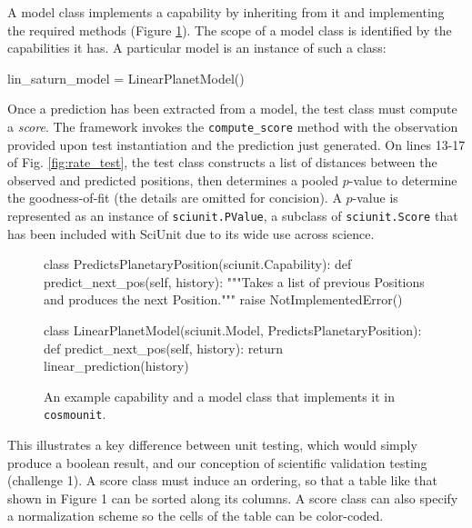 \documentclass[9pt]{sig-alternate}
\newcommand{\verbx}[1]{\lstinline{#1}}
\begin{document}
A model class implements a capability by inheriting from it and implementing the required methods (Figure \ref{fig:capability}).  The scope of a model class is identified by the capabilities it has. A particular model is an instance of such a class: 
\vspace{-3px}
\begin{python}
lin_saturn_model = LinearPlanetModel()
\end{python}
\vspace{-5px}

Once a prediction has been extracted from a model, the test class must compute a \emph{score}. The framework invokes the \verbx{compute_score} method with the observation provided upon test instantiation and the prediction just generated. On lines 13-17 of Fig. \ref{fig:rate_test}, the test class constructs a list of distances between the observed and predicted positions, then determines a pooled $p$-value to determine the goodness-of-fit (the details are omitted for concision). A $p$-value is represented as an instance of \verbx{sciunit.PValue}, a subclass of \texttt{sciunit.Score} that has been included with {SciUnit} due to its wide use across science. %
\begin{figure}
\small
\begin{python}
class PredictsPlanetaryPosition(sciunit.Capability):
  def predict_next_pos(self, history): 
    """Takes a list of previous Positions and produces the next Position."""
    raise NotImplementedError()

class LinearPlanetModel(sciunit.Model, 
    PredictsPlanetaryPosition):
  def predict_next_pos(self, history):
    return linear_prediction(history)
\end{python}
\vspace{-12px}
\caption{\small An example capability and a model class that implements it in \verbx{cosmounit}.}
\label{fig:capability}
\vspace{-10px}
\end{figure}

This illustrates a key difference between unit testing, which would simply produce a boolean result, and our conception of scientific validation testing (challenge 1). A score class must induce an ordering, so that a table like that shown in Figure 1 can be sorted along its columns. A score class can also specify a normalization scheme so the cells of the table can be color-coded.  %
\end{document}
